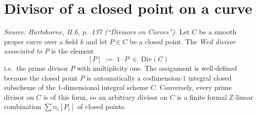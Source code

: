 \section{Divisor of a closed point on a curve}
\begin{definition}
  \label{def:divisor_closed_point}
  
  \textit{Source: Hartshorne, II.6, p.~137 (``Divisors on Curves'').}
  Let \(C\) be a smooth proper curve over a field \(k\) and let \(P \in C\) be a
  closed point. The \emph{Weil divisor associated to \(P\)} is the element
  \[
    [P] \;:=\; 1 \cdot P \;\in\; \mathrm{Div}(C)
  \]
  i.e.\ the prime divisor \(P\) with multiplicity one. The assignment is
  well-defined because the closed point \(P\) is automatically a codimension-\(1\)
  integral closed subscheme of the \(1\)-dimensional integral scheme \(C\).
  Conversely, every prime divisor on \(C\) is of this form, so an arbitrary
  divisor on \(C\) is a finite formal \(\mathbb Z\)-linear combination
  \(\sum n_i [P_i]\) of closed points.

\end{definition}
